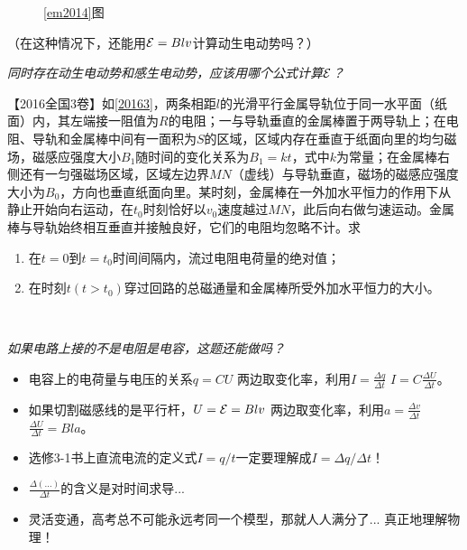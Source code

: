 \documentclass[a4paper,9pt]{ctexart}
\newcommand{\emf}{{\cal E}}
\begin{document}
\begin{figure}[H]
\centering
{}
\caption{\cref{em2014}图\label{20142}}
\end{figure}
\begin{ans}
（在这种情况下，还能用$\emf = Blv$计算动生电动势吗？）
\vspace{8cm}
\end{ans}
\newpage
\par
\emph{同时存在动生电动势和感生电动势，应该用哪个公式计算$\emf$？}
\begin{eg} \label{em2016}
【2016全国3卷】如\cref{20163}，两条相距$l$的光滑平行金属导轨位于同一水平面（纸面）内，其左端接一阻值为$R$的电阻；一与导轨垂直的金属棒置于两导轨上；在电阻、导轨和金属棒中间有一面积为$S$的区域，区域内存在垂直于纸面向里的均匀磁场，磁感应强度大小$B_1$随时间的变化关系为$B_1 = kt$，式中$k$为常量；在金属棒右侧还有一匀强磁场区域，区域左边界$MN$（虚线）与导轨垂直，磁场的磁感应强度大小为$B_0$，方向也垂直纸面向里。某时刻，金属棒在一外加水平恒力的作用下从静止开始向右运动，在$t_0$时刻恰好以$v_0$速度越过$MN$，此后向右做匀速运动。金属棒与导轨始终相互垂直并接触良好，它们的电阻均忽略不计。求
\begin{enumerate}
\item
在$t=0$到$t=t_0$时间间隔内，流过电阻电荷量的绝对值；
\item
在时刻$t(t>t_0)$穿过回路的总磁通量和金属棒所受外加水平恒力的大小。
\end{enumerate}
\end{eg}
\begin{ans}
\ \\
\vspace{8cm}
\end{ans}
\newpage
\par
\emph{如果电路上接的不是电阻是电容，这题还能做吗？}
\begin{itemize}
\item
电容上的电荷量与电压的关系$q = CU$ \so 两边取变化率，利用$I = \frac{\Delta q}{\Delta t}$ \so $I = C \frac{\Delta U}{\Delta t}$。
\item
如果切割磁感线的是平行杆，$U = \emf = Blv$ \so 两边取变化率，利用$a = \frac{\Delta v}{\Delta t}$ \so $ \frac{\Delta U}{\Delta t} = Bla$。
\item
选修3-1书上直流电流的定义式$I = q/t$一定要理解成$I = \Delta q /\Delta t$！
\item
$\frac{\Delta (\dots)}{\Delta t}$的含义是对时间求导...
\item
灵活变通，高考总不可能永远考同一个模型，那就人人满分了... \so 真正地理解物理！
\end{itemize}
\end{document}

